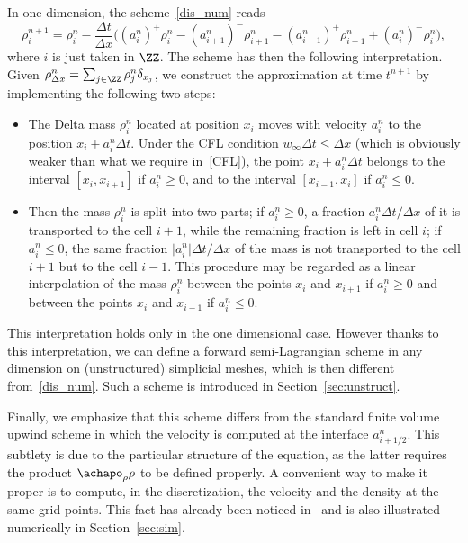 \begin{exam}\label{ex1D}
In one dimension, the scheme~\eqref{dis_num} reads
\[
\rho_{i}^{n+1} = \rho_i^n - \frac{\Delta t}{\Delta x}\Big((a_i^n)^+ \rho_i^n - (a_{i+1}^n)^- \rho_{i+1}^n - (a_{i-1}^n)^+ \rho_{i-1}^n + (a_i^n)^-\rho_i^n\Big),
\]
where $i$ is just taken in $\ZZ$. The scheme has then the following interpretation. Given $\rho^n_{\Delta x} = \sum_{j\in \ZZ} \rho_j^n \delta_{x_j}$, we construct the approximation at time $t^{n+1}$ by implementing the following two steps:
\begin{itemize}
\item The Delta mass $\rho_i^n$ located at position $x_i$ moves with velocity $a_i^n$ to the position $x_i+a_i^n \Delta t$. Under the CFL condition $w_\infty \Delta t \leq \Delta x$ (which is obviously weaker than what we require in~\eqref{CFL}), the point $x_i+a_i^n\Delta t$ belongs to the interval $[x_i,x_{i+1}]$ if $a_i^n\geq 0$, and to the interval $[x_{i-1},x_{i}]$ if $a_i^n\leq 0$.
\item Then the mass $\rho_{i}^n$ is split into two parts; if $a_{i}^n \geq 0$, a fraction $a_{i}^n \Delta t/\Delta x$ of it is transported to the cell $i+1$, while the remaining fraction is left in cell $i$; if $a_{i}^n \leq 0$, the same fraction $\vert a_{i}^n \vert \Delta t/\Delta x$ of the mass is not transported to the cell $i+1$ but to the cell $i-1$. This procedure may be regarded as a linear interpolation of the mass $\rho_{i}^n$ between the points $x_{i}$ and $x_{i+1}$ if $a_{i}^n \geq 0$ and between the points $x_{i}$ and $x_{i-1}$ if $a_{i}^n \leq 0$.
\end{itemize}
This interpretation holds only in the one dimensional case. However thanks to this interpretation, we can define a forward semi-Lagrangian scheme in any dimension on (unstructured) simplicial meshes, which is then different from~\eqref{dis_num}. Such a scheme is introduced in Section~\ref{sec:unstruct}.

Finally, we emphasize that this scheme differs from the standard finite volume upwind scheme in which the velocity is computed at the interface $a_{i+1/2}^n$. This subtlety is due to the particular structure of the equation, as the latter requires the product $\achapo_{\rho} \rho$ to be defined properly. A convenient way to make it proper is to compute, in the discretization, the velocity and the density at the same grid points. This fact has already been noticed in~\cite{sinum,sisc} and is also illustrated numerically in Section~\ref{sec:sim}.
\end{exam}


